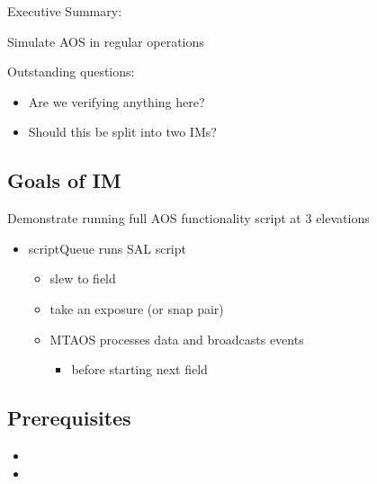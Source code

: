 
Executive Summary:

Simulate AOS in regular operations

Outstanding questions:
\begin{itemize}
\item Are we verifying anything here?
\item Should this be split into two \glspl{IM}?
\end{itemize}

\subsection{Goals of IM}
Demonstrate running full \gls{AOS} functionality script at 3 elevations
\begin{itemize}
\item scriptQueue runs \gls{SAL} script
  \begin{itemize}
  \item slew to field
  \item take an exposure (or snap pair)
  \item \gls{MTAOS} processes data and broadcasts events
    \begin{itemize}
    \item before starting next field
    \end{itemize}
  \end{itemize}
\end{itemize}

\subsection{Prerequisites}

\begin{itemize}
\item {}
\item {}
\end{itemize}
